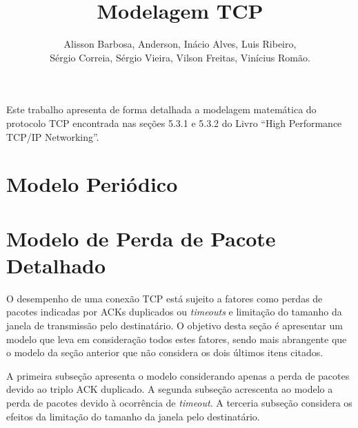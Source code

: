\documentclass[12pt]{article}
\title{Modelagem TCP}
\author{Alisson Barbosa, Anderson, Inácio Alves, Luis Ribeiro,\\
 Sérgio Correia, Sérgio Vieira, Vilson Freitas, Vinícius Romão.}
\begin{document}
 

\maketitle

     
\begin{resumo} 
  Este trabalho apresenta de forma detalhada a modelagem matemática do protocolo
  TCP encontrada nas seções 5.3.1 e 5.3.2 do Livro ``High Performance TCP/IP Networking''.
\end{resumo}


\section{Modelo Periódico}



\section{Modelo de Perda de Pacote Detalhado}
O desempenho de uma conexão TCP está sujeito a fatores como perdas de pacotes indicadas por 
ACKs duplicados ou \textit{timeouts} e limitação do tamanho da janela de transmissão pelo 
destinatário. O objetivo desta seção é apresentar um modelo que leva em consideração todos 
estes fatores, sendo mais abrangente que o modelo da seção anterior que não considera os dois
últimos itens citados.

A primeira subseção apresenta o modelo considerando apenas a perda de pacotes devido ao 
triplo ACK duplicado. A segunda subseção acrescenta ao modelo a perda de pacotes devido à
ocorrência de \textit{timeout}. A terceria subseção considera os efeitos da limitação do 
tamanho da janela pelo destinatário.




\end{document}
